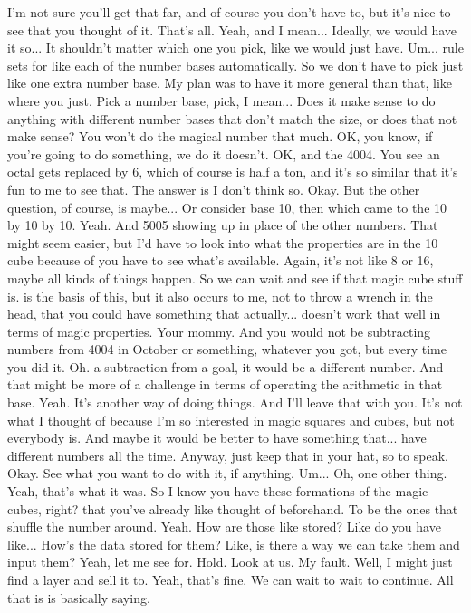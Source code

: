 \documentclass{article}
\begin{document}
I'm not sure you'll get that far, and of course you don't have to, but it's nice to see that you thought of it. That's all. Yeah, and I mean...
Ideally, we would have it so...
It shouldn't matter which one you pick, like we would just have.
Um...
rule sets for like each of the number bases automatically. So we don't have to pick just like one extra number base. My plan was to have it more general than that, like where you just.
Pick a number base, pick, I mean...
Does it make sense to do anything with different number bases that don't match the size, or does that not make sense? You won't do the magical number that much. OK, you know, if you're going to do something, we do it doesn't. OK, and the 4004.
You see an octal gets replaced by 6, which of course is half a ton, and it's so similar that it's fun to me to see that.
The answer is I don't think so. Okay. But the other question, of course, is maybe...
Or consider base 10, then which came to the 10 by 10 by 10. Yeah. And 5005 showing up in place of the other numbers.
That might seem easier, but I'd have to look into what the properties are in the 10 cube because of you have to see what's available. Again, it's not like 8 or 16, maybe all kinds of things happen. So we can wait and see if that magic cube stuff is.
is the basis of this, but it also occurs to me, not to throw a wrench in the head, that you could have something that actually...
doesn't work that well in terms of magic properties.
Your mommy.
And you would not be subtracting numbers from 4004 in October or something, whatever you got, but every time you did it.
Oh.
a subtraction from a goal, it would be a different number. And that might be more of a challenge in terms of operating the arithmetic in that base. Yeah.
It's another way of doing things. And I'll leave that with you. It's not what I thought of because I'm so interested in magic squares and cubes, but not everybody is. And maybe it would be better to have something that...
have different numbers all the time. Anyway, just keep that in your hat, so to speak. Okay. See what you want to do with it, if anything.
Um...
Oh, one other thing. Yeah, that's what it was. So I know you have these formations of the magic cubes, right?
that you've already like thought of beforehand. To be the ones that shuffle the number around. Yeah. How are those like stored? Like do you have like...
How's the data stored for them? Like, is there a way we can take them and input them? Yeah, let me see for.
Hold.
Look at us.
My fault. Well, I might just find a layer and sell it to. Yeah, that's fine.
We can wait to wait to continue. All that is is basically saying.
\end{document}
